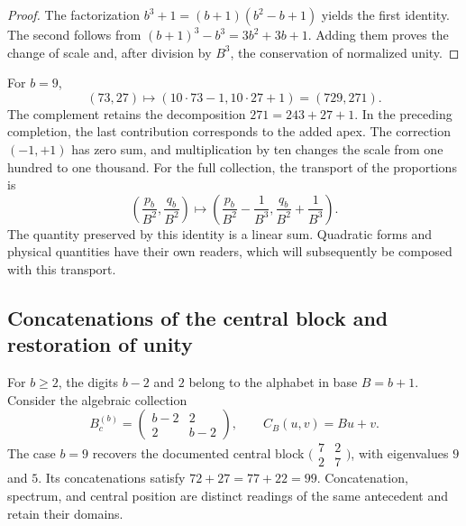 \begin{proof}
The factorization \(b^3+1=(b+1)(b^2-b+1)\) yields the first
identity. The second follows from
\((b+1)^3-b^3=3b^2+3b+1\). Adding them proves the change of scale and,
after division by \(B^3\), the conservation of normalized unity.
\end{proof}

For \(b=9\),
\begin{equation}
 (73,27)\longmapsto(10\cdot73-1,10\cdot27+1)=(729,271).
 \label{lib03:caso-729}
\end{equation}
The complement retains the decomposition \(271=243+27+1\). In the
preceding completion, the last contribution corresponds to the added
apex. The correction \((-1,+1)\) has zero sum, and multiplication
by ten changes the scale from one hundred to one thousand. For the full
collection, the transport of the proportions is
\begin{equation}
 \left(\frac{p_b}{B^2},\frac{q_b}{B^2}\right)
 \longmapsto
 \left(\frac{p_b}{B^2}-\frac1{B^3},
       \frac{q_b}{B^2}+\frac1{B^3}\right).
 \label{lib03:fracciones-completacion}
\end{equation}
The quantity preserved by this identity is a linear sum. Quadratic
forms and physical quantities have their own readers, which will
subsequently be composed with this transport.

\subsection{Concatenations of the central block and restoration of unity}
\label{lib03:centro}

For \(b\geq2\), the digits \(b-2\) and \(2\) belong to the alphabet in
base \(B=b+1\). Consider the algebraic collection
\begin{equation}
 B_c^{(b)}=\begin{pmatrix}b-2&2\\2&b-2\end{pmatrix},\qquad
 C_B(u,v)=Bu+v.
 \label{lib03:bloque-central}
\end{equation}
The case \(b=9\) recovers the documented central block
\(\bigl(\begin{smallmatrix}7&2\\2&7\end{smallmatrix}\bigr)\), with
eigenvalues \(9\) and \(5\). Its concatenations satisfy
\(72+27=77+22=99\). Concatenation, spectrum, and central position are
distinct readings of the same antecedent and retain their domains.

